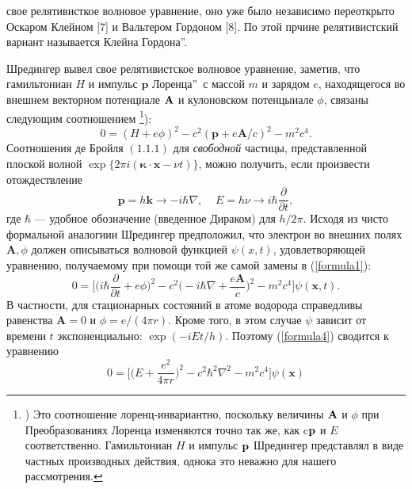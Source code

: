 \documentclass{article}
\begin{document}
	\pagestyle{fancy}
		\Russian{} свое релятивисткое волновое уравнение, оно уже было независимо переоткрыто Оскаром Клейном [7] и Вальтером Гордоном [8]. По этой прчине релятивистский вариант называется  Клейна Гордона\textquotedblright.
		
		Шредингер вывел свое релятивистское волновое уравнение, заметив, что гамильтониан $H$ и импульс $\textbf{p}$  Лоренца\textquotedblright\ с массой $m$ и зарядом $e$, находящегося во внешнем векторном потенциале $\vb{A}$ и кулоновском потенцыиале $\phi$, связаны следующим соотношением \footnote{) Это соотношение лоренц-инвариантно, поскольку величины $\vb{A}$ и $\phi$ при Преобразованиях Лоренца изменяются точно так же, как c$\vb{p}$ и $E$ соответственно. Гамильтониан $H$ и импульс $\vb{p}$ Шредингер представлял в виде частных производных действия, однока это неважно для нашего рассмотрения.}):
		\begin{equation}
			\label{formula1}
			0 = (H+e\phi )^2-c^2(\textbf{p} +e\textbf{A} /c)^2-m^2c^4.
		\end{equation}
		Соотношения де Бройля $(1.1 .1)$ для \textit{свободной} частицы, представленной плоской волной $\exp \{ 2 \pi i (\boldsymbol{\kappa} \cdot \textbf{x} - \nu t) \}$, можно получить, если произвести отождествление
		\begin{equation}
			\label{formula2}
			\textbf{p} = h\textbf{k}\rightarrow -i\hbar\nabla,\;\;\;\; E=h\nu \rightarrow i\hbar \frac{\partial}{\partial t},
		\end{equation}
		где $\hbar$ --- удобное обозначение (введенное Дираком) для $h / 2 \pi$. Исходя из чисто формальной аналогиии Шредингер предположил, что электрон во внешних полях $\textbf{A}, \phi$ должен описываться волновой функцией $\psi (x, t)$, удовлетворяющей уравнению, получаемому при помощи той же самой замены в (\ref{formula1}):
		\begin{equation}
			\label{formula3}
			0 = \biggl[\biggl(i\hbar \frac{\partial}{\partial t}+e\phi \biggr)^2 - c^2\biggl(-i\hbar \nabla +\frac{e \textbf{A}}{c}\biggr)^2-m^2c^4\biggr]\psi (\textbf {x},t).
		\end{equation}
		В частности, для стационарных состояний в атоме водорода справедливы равенства $\textbf{A} = 0$ и $\phi = e/(4 \pi r)$. Кроме того, в этом случае $\psi$ зависит от времени $t$ экспоненциально: $\exp (-i E t / h)$. Поэтому (\ref{formula4}) сводится к уравнению
		\begin{equation}
			\label{formula4}
			0 = \biggl[\biggl(E+\frac{e^2}{4\pi r}\biggr)^2-c^2\hbar^2\nabla^2-m^2c^4\biggr]\psi (\textbf{x})
		\end{equation}
\end{document}
